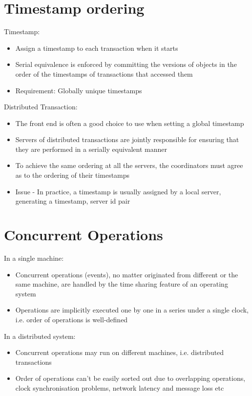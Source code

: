 \documentclass{article}[18pt]
\begin{document}
\section{Timestamp ordering}
Timestamp:
\begin{itemize}
	\item Assign a timestamp to each transaction when it starts
	\item Serial equivalence is enforced by committing the versions of objects in the order of the timestamps of transactions that accessed them
	\item Requirement: Globally unique timestamps
\end{itemize}
Distributed Transaction:
\begin{itemize}
	\item The front end is often a good choice to use when setting a global timestamp
	\item Servers of distributed transactions are jointly responsible for ensuring that they are performed in a serially equivalent manner
	\item To achieve the same ordering at all the servers, the coordinators must agree as to the ordering of their timestamps
	\item Issue - In practice, a timestamp is usually assigned by a local server, generating a timestamp, server id pair
\end{itemize}
\section{Concurrent Operations}
In a single machine:
\begin{itemize}
	\item Concurrent operations (events), no matter originated from different or the same machine, are handled by the time sharing feature of an operating system
	\item Operations are implicitly executed one by one in a series under a single clock, i.e. order of operations is well-defined
\end{itemize}
In a distributed system:
\begin{itemize}
	\item Concurrent operations may run on different machines, i.e. distributed transactions
	\item Order of operations can't be easily sorted out due to overlapping operations, clock synchronisation problems, network latency and message loss etc
\end{itemize}
\end{document}

